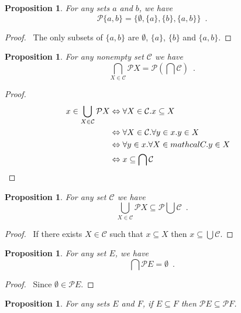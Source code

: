 \documentclass{report}
\let\qed\relax
\newtheorem{prop}[ax]{Proposition}
\theoremstyle{definition}
\begin{document}
\begin{prop}
For any sets $a$ and $b$, we have
\[ \mathcal{P} \{ a,b \} = \{ \emptyset, \{a\}, \{b\}, \{a,b\} \} \enspace . \]
\end{prop}

\begin{proof}
\pf\ The only subsets of $\{a,b\}$ are $\emptyset$, $\{a\}$, $\{b\}$ and $\{a,b\}$. \qed
\end{proof}

\begin{prop}
For any nonempty set $\mathcal{C}$ we have
\[ \bigcap_{X \in \mathcal{C}} \mathcal{P} X = \mathcal{P} \left( \bigcap \mathcal{C} \right) \enspace . \]
\end{prop}

\begin{proof}
\pf
\begin{align*}
x \in \bigcup_{X \in \mathcal{C}} \mathcal{P} X
& \Leftrightarrow \forall X \in \mathcal{C}. x \subseteq X \\
& \Leftrightarrow \forall X \in \mathcal{C}. \forall y \in x. y \in X \\
& \Leftrightarrow \forall y \in x. \forall X \in mathcal{C}. y \in X \\
& \Leftrightarrow x \subseteq \bigcap \mathcal{C} & \qed
\end{align*}
\end{proof}

\begin{prop}
For any set $\mathcal{C}$ we have
\[ \bigcup_{X \in \mathcal{C}} \mathcal{P} X \subseteq \mathcal{P} \bigcup \mathcal{C} \enspace . \]
\end{prop}

\begin{proof}
\pf\ If there exists $X \in \mathcal{C}$ such that $x \subseteq X$ then $x \subseteq \bigcup \mathcal{C}$. \qed
\end{proof}

\begin{prop}
For any set $E$, we have
\[ \bigcap \mathcal{P} E = \emptyset \enspace . \]
\end{prop}

\begin{proof}
\pf\ Since $\emptyset \in \mathcal{P} E$. \qed
\end{proof}

\begin{prop}
For any sets $E$ and $F$, if $E \subseteq F$ then $\mathcal{P} E \subseteq \mathcal{P} F$.
\end{prop}
\end{document}
